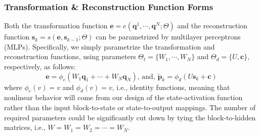 \documentclass[smallabstract,smallcaptions]{dccpaper}
\begin{document}
\subsubsection{Transformation \& Reconstruction Function Forms}
Both the transformation function $\mathbf{e} = e(\mathbf{q}^1, \cdots, \mathbf{q}^N ; \Theta)$ and the reconstruction function $\mathbf{s}_k = s(\mathbf{e}, \mathbf{s}_{k-1} ; \Theta)$ can be parametrized by multilayer perceptrons (MLPs). 
Specifically, we simply parametrize the transformation and reconstruction functions, using parameters $\Theta_t = \{W_1, \cdots, W_N\}$ and $\Theta_d = \{U, \mathbf{c}\}$, respectively, as follows:
\begin{equation}
\mathbf{e} = \phi_e(W_1 \mathbf{q}_1 + \cdots + W_N \mathbf{q}_N) \mbox{, and, } 
\widetilde{\mathbf{p}}_k = \phi_d(U \mathbf{s}_k + \mathbf{c})
\nonumber %
\end{equation}
where $\phi_e(v) = v$ and $\phi_d(v) = v$, i.e., identity functions, meaning that nonlinear behavior will come from our design of the state-activation function rather than the input block-to-state or state-to-output mappings. The number of required parameters could be significantly cut down by tying the block-to-hidden matrices, i.e., $W = W_1 = W_2 = \cdots = W_N$.

\end{document}

